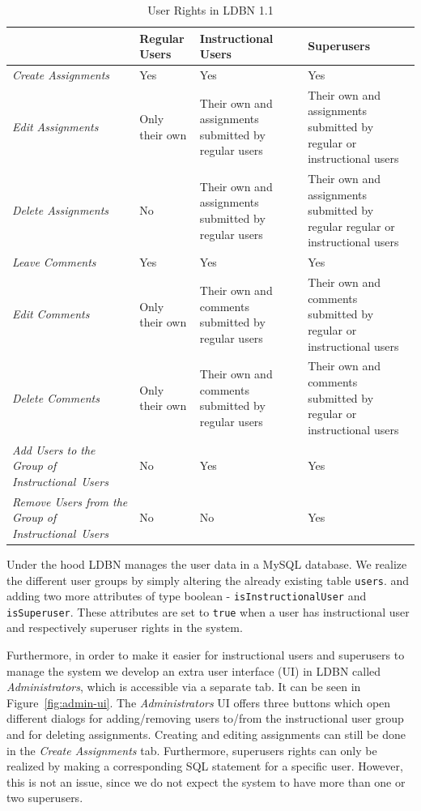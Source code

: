 \begin{center}
\begin{table}
\begin{tabular}[h]{| m{2.8cm} || m{2.2cm} | m{3.2cm} | m{3.3cm} |}
\hline
 & \textbf{Regular Users} & \textbf{Instructional Users} & \textbf{Superusers} \\
\hline
\hline
\emph{Create \mbox{Assignments}} & Yes & Yes & Yes \\
\hline
\emph{Edit \mbox{Assignments}}  & Only their own & Their own and assignments submitted by regular users & Their own and assignments submitted by regular or instructional users \\
\hline
\emph{Delete \mbox{Assignments}} & No & Their own and assignments submitted by regular users & Their own and assignments submitted by regular regular or instructional users \\
\hline
\emph{Leave \mbox{Comments}}    & Yes & Yes & Yes \\
\hline
\emph{Edit \mbox{Comments}}     & Only their own & Their own and comments submitted by regular users & Their own and comments submitted by regular or instructional users\\
\hline
\emph{Delete \mbox{Comments}}   & Only their own & Their own and comments submitted by regular users & Their own and comments submitted by regular or instructional users \\
\hline
\emph{Add Users to the Group of \mbox{Instructional Users}} & No & Yes & Yes \\
\hline
\emph{Remove Users from the Group of \mbox{Instructional Users}} & No & No & Yes \\
\hline
\end{tabular}
\caption{User Rights in LDBN 1.1}
\label{tab:user-rights}
\end{table}
\end{center}


Under the hood LDBN manages the user data in a MySQL database. 
We realize the different user groups by simply altering the already existing table \verb=users=. 
and adding two more attributes 
of type boolean - \verb=isInstructionalUser= and \verb=isSuperuser=. 
These attributes are set to \verb=true= when a user has instructional user and respectively superuser 
rights in the system. 

Furthermore, in order to make it easier for instructional users and superusers to manage the system
we develop an extra user interface (UI) in LDBN called \emph{Administrators}, which is accessible via a
separate tab. It can be seen in Figure~\ref{fig:admin-ui}. 
The \emph{Administrators} UI offers three buttons which open 
different dialogs for adding/removing users to/from the instructional user group and for
deleting assignments. Creating and editing assignments can still be done in the 
\emph{Create Assignments} tab. Furthermore, superusers rights can only be realized by making
a corresponding SQL statement for a specific user. However, this is not an issue, since 
we do not expect the system to have more than one or two superusers. 

